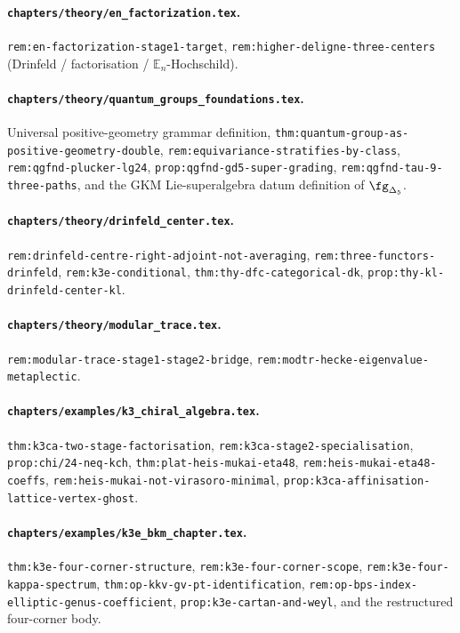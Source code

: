 \paragraph{\texttt{chapters/theory/en\_factorization.tex}.}
\texttt{rem:en-factorization-stage1-target},
\texttt{rem:higher-deligne-three-centers} (Drinfeld /
factorisation / $\mathbb{E}_n$-Hochschild).

\paragraph{\texttt{chapters/theory/quantum\_groups\_foundations.tex}.}
Universal positive-geometry grammar definition,
\texttt{thm:quantum-group-as-positive-geometry-double},
\texttt{rem:equivariance-stratifies-by-class},
\texttt{rem:qgfnd-plucker-lg24},
\texttt{prop:qgfnd-gd5-super-grading},
\texttt{rem:qgfnd-tau-9-three-paths}, and the GKM
Lie-superalgebra datum definition of $\fg_{\Delta_5}$.

\paragraph{\texttt{chapters/theory/drinfeld\_center.tex}.}
\texttt{rem:drinfeld-centre-right-adjoint-not-averaging},
\texttt{rem:three-functors-drinfeld}, \texttt{rem:k3e-conditional},
\texttt{thm:thy-dfc-categorical-dk},
\texttt{prop:thy-kl-drinfeld-center-kl}.

\paragraph{\texttt{chapters/theory/modular\_trace.tex}.}
\texttt{rem:modular-trace-stage1-stage2-bridge},
\texttt{rem:modtr-hecke-eigenvalue-metaplectic}.

\paragraph{\texttt{chapters/examples/k3\_chiral\_algebra.tex}.}
\texttt{thm:k3ca-two-stage-factorisation},
\texttt{rem:k3ca-stage2-specialisation},
\texttt{prop:chi/24-neq-kch},
\texttt{thm:plat-heis-mukai-eta48},
\texttt{rem:heis-mukai-eta48-coeffs},
\texttt{rem:heis-mukai-not-virasoro-minimal},
\texttt{prop:k3ca-affinisation-lattice-vertex-ghost}.

\paragraph{\texttt{chapters/examples/k3e\_bkm\_chapter.tex}.}
\texttt{thm:k3e-four-corner-structure},
\texttt{rem:k3e-four-corner-scope},
\texttt{rem:k3e-four-kappa-spectrum},
\texttt{thm:op-kkv-gv-pt-identification},
\texttt{rem:op-bps-index-elliptic-genus-coefficient},
\texttt{prop:k3e-cartan-and-weyl}, and the restructured
four-corner body.

